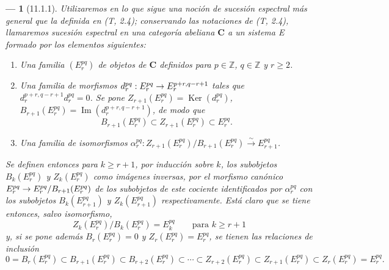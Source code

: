 \documentclass[10pt,oneside,openany]{book}
\theoremstyle{egaenv}\newtheorem*{env}{---}
\theoremstyle{egastatement}
\theoremstyle{egadescription}
\renewcommand{\geq}{\geqslant}
\renewcommand{\to}{\mathchoice{\longrightarrow}{\rightarrow}{\rightarrow}{\rightarrow}}
\begin{document}
\begin{env}[11.1.1]
\label{0.11.1.1-fr}
Utilizaremos en lo que sigue una noción de sucesión espectral más general que
la definida en (T, 2.4); conservando las notaciones de (T, 2.4),
llamaremos \emph{sucesión espectral} en una categoría abeliana $\boldsymbol{C}$ a un
sistema E formado por los elementos siguientes:
\begin{enumerate}
  \item[$a)$] Una familia $(E_r^{pq})$ de objetos de $\boldsymbol{C}$ definidos para
    $p\in\mathbb Z$, $q\in\mathbb Z$ y $r\geq2$.
  \item[$b)$] Una familia de morfismos
    $d_r^{pq}:E_r^{pq}\to E_r^{p+r,q-r+1}$ tales que
    $d_r^{p+r,q-r+1}d_r^{pq}=0$. Se pone
    $Z_{r+1}(E_r^{pq})=\operatorname{Ker}(d_r^{pq})$,
    $B_{r+1}(E_r^{pq})=\operatorname{Im}(d_r^{p+r,q-r+1})$, de modo que
    \[
      B_{r+1}(E_r^{pq})\subset Z_{r+1}(E_r^{pq})\subset E_r^{pq}.
    \]
  \item[$c)$] Una familia de isomorfismos
    $\alpha_r^{pq}:Z_{r+1}(E_r^{pq})/B_{r+1}(E_r^{pq})
    \xrightarrow{\sim}E_{r+1}^{pq}$.
\end{enumerate}

Se definen entonces para $k\geq r+1$, por inducción sobre $k$, los subobjetos
$B_k(E_r^{pq})$ y $Z_k(E_r^{pq})$ como imágenes inversas, por el morfismo
canónico $E_r^{pq}\to E_r^{pq}/B_{r+1}(E_r^{pq})$ de los subobjetos de este
cociente identificados por $\alpha_r^{pq}$ con los subobjetos $B_k(E_{r+1}^{pq})$ y
$Z_k(E_{r+1}^{pq})$ respectivamente. Está claro que se tiene entonces, salvo
isomorfismo,
\[
\label{0.11.1.1.1-fr}
  Z_k(E_r^{pq})/B_k(E_r^{pq})=E_k^{pq}
  \qquad\text{para }k\geq r+1
  \tag{11.1.1.1}
\]
y, si se pone además $B_r(E_r^{pq})=0$ y $Z_r(E_r^{pq})=E_r^{pq}$, se tienen
las relaciones de inclusión
\[
\label{0.11.1.1.2-fr}
  0=B_r(E_r^{pq})\subset B_{r+1}(E_r^{pq})\subset B_{r+2}(E_r^{pq})
  \subset\cdots\subset Z_{r+2}(E_r^{pq})\subset Z_{r+1}(E_r^{pq})
  \subset Z_r(E_r^{pq})=E_r^{pq}.
  \tag{11.1.1.2}
\]


\end{env}
\end{document}
